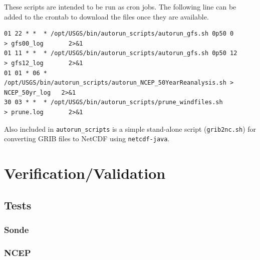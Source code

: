 \documentclass[11pt]{article}   %
\begin{document}
These scripts are intended to be run as cron jobs.  The following line can be added to the
crontab to download the files once they are available.
\footnotesize
\begin{verbatim}
01 22 * *  * /opt/USGS/bin/autorun_scripts/autorun_gfs.sh 0p50 0            > gfs00_log       2>&1
01 11 * *  * /opt/USGS/bin/autorun_scripts/autorun_gfs.sh 0p50 12           > gfs12_log       2>&1
01 01 * 06 * /opt/USGS/bin/autorun_scripts/autorun_NCEP_50YearReanalysis.sh > NCEP_50yr_log   2>&1
30 03 * *  * /opt/USGS/bin/autorun_scripts/prune_windfiles.sh               > prune.log       2>&1
\end{verbatim}
\normalsize

Also included in \texttt{autorun\_scripts} is a simple stand-alone script (\texttt{grib2nc.sh})
for converting GRIB files to NetCDF using \texttt{netcdf-java}.

\section{Verification/Validation}
\subsection{Tests}
\subsubsection{Sonde}
\subsubsection{NCEP}
\end{document}
